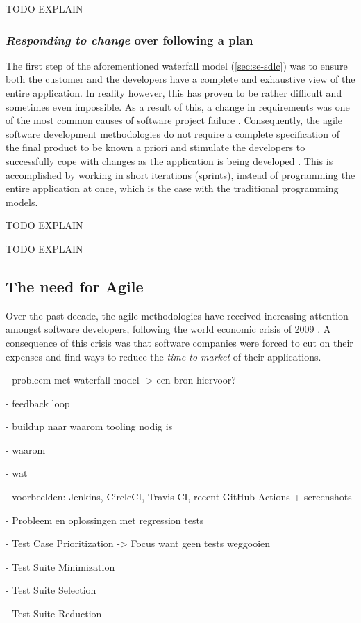 TODO EXPLAIN

\subsubsection{\emph{Responding to change} over following a plan}
The first step of the aforementioned waterfall model (\autoref{sec:se-sdlc}) was to ensure both the customer and the developers have a complete and exhaustive view of the entire application. In reality however, this has proven to be rather difficult and sometimes even impossible. As a result of this, a change in requirements was one of the most common causes of software project failure \cite{glass2001agile}. Consequently, the agile software development methodologies do not require a complete specification of the final product to be known a priori and stimulate the developers to successfully cope with changes as the application is being developed \cite{Hazzan2014}. This is accomplished by working in short iterations (sprints), instead of programming the entire application at once, which is the case with the traditional programming models.

TODO EXPLAIN

TODO EXPLAIN

\subsection{The need for Agile}
Over the past decade, the agile methodologies have received increasing attention amongst software developers, following the world economic crisis of 2009 \cite{ionel2009}. A consequence of this crisis was that software companies were forced to cut on their expenses and find ways to reduce the \emph{time-to-market} of their applications.

- probleem met waterfall model -> een bron hiervoor?

- feedback loop

- buildup naar waarom tooling nodig is

- waarom

- wat

- voorbeelden: Jenkins, CircleCI, Travis-CI, recent GitHub Actions + screenshots

- Probleem en oplossingen met regression tests

  - Test Case Prioritization -> Focus want geen tests weggooien
  
  - Test Suite Minimization
  
  - Test Suite Selection
  
  - Test Suite Reduction
